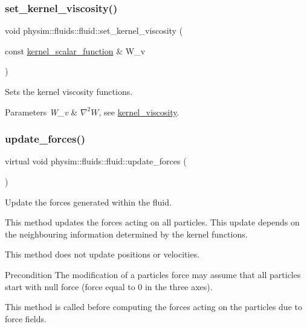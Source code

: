 \subsubsection{\texorpdfstring{set\+\_\+kernel\+\_\+viscosity()}{set\_kernel\_viscosity()}}
{\footnotesize\ttfamily void physim\+::fluids\+::fluid\+::set\+\_\+kernel\+\_\+viscosity (\begin{DoxyParamCaption}\item[{const \hyperlink{namespacephysim_1_1fluids_a22c55c76ab3fe3de79dada15e2f9c2d6}{kernel\+\_\+scalar\+\_\+function} \&}]{W\+\_\+v }\end{DoxyParamCaption})}



Sets the kernel viscosity functions. 


\begin{DoxyParams}{Parameters}
{\em W\+\_\+v} & $\nabla^2 W$, see \hyperlink{classphysim_1_1fluids_1_1fluid_a5ba8b8fc47ed8c45c279aebf5d62899d}{kernel\+\_\+viscosity}. \\
\hline
\end{DoxyParams}
\mbox{\label{classphysim_1_1fluids_1_1fluid_a6cde063d44b1e33199c08e64d801bb04}} 
\subsubsection{\texorpdfstring{update\+\_\+forces()}{update\_forces()}\hspace{0.1cm}{\footnotesize\ttfamily [1/2]}}
{\footnotesize\ttfamily virtual void physim\+::fluids\+::fluid\+::update\+\_\+forces (\begin{DoxyParamCaption}{ }\end{DoxyParamCaption})\hspace{0.3cm}{\ttfamily [pure virtual]}}



Update the forces generated within the fluid. 

This method updates the forces acting on all particles. This update depends on the neighbouring information determined by the kernel functions.

This method does not update positions or velocities.

\begin{DoxyPrecond}{Precondition}
The modification of a particles\textquotesingle{} force may assume that all particles start with null force (force equal to 0 in the three axes). 

This method is called before computing the forces acting on the particles due to force fields. 
\end{DoxyPrecond}


